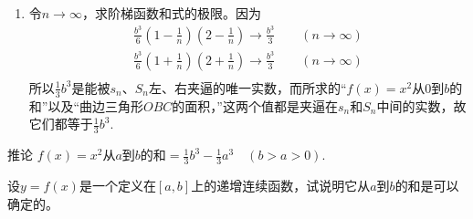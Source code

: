 \begin{solution}
\begin{enumerate}
\item 令$n\to\infty$，求阶梯函数和式的极限。因为
\[\begin{split}
    \frac{b^3}{6} \left(1-\frac{1}{n}\right)\left(2-\frac{1}{n}\right)\to \frac{b^3}{3}\qquad (n\to\infty)\\
    \frac{b^3}{6} \left(1+\frac{1}{n}\right)\left(2+\frac{1}{n}\right)\to \frac{b^3}{3}\qquad (n\to\infty)\\
\end{split}\]
所以$\frac{1}{3}b^3$是能被$s_n$、$S_n$左、右夹逼的唯一实数，而所求的“$f(x)=x^2$从0到$b$的和”以及“曲边三角形$OBC$的面积，”这两个值都是夹逼在$s_n$和$S_n$中间的实数，故它们都等于$\frac{1}{3}b^3$.
\end{enumerate}
\end{solution}

\begin{blk}
    {推论} $f(x)=x^2$从$a$到$b$的和$=\frac{1}{3}b^3-\frac{1}{3}a^3\quad  (b> a> 0)$.
\end{blk}


\begin{example}
设$y=f(x)$是一个定义在$[a,b]$上的递增连续函数，试说明它从$a$到$b$的和是可以确定的。
\end{example}

\begin{figure}[htp]
    \centering
{}
    \caption{}
\end{figure}

